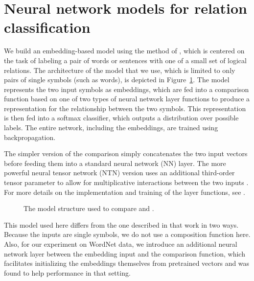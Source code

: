 
\section{Neural network models for relation classification} \label{methods}

We build an embedding-based model using the method of
\cite{Bowman:Potts:Manning:2014}, which is centered on the task of
labeling a pair of words or sentences with one of a small set of
logical relations. The architecture of the model that we use, which is
limited to only pairs of single symbols (such as words), is depicted
in Figure~\ref{sample-figure}. The model represents the two input
symbols as embeddings, which are fed into a comparison function based
on one of two types of neural network layer functions to produce a
representation for the relationship between the two symbols. This
representation is then fed into a softmax classifier, which outputs a
distribution over possible labels. The entire network, including the
embeddings, are trained using backpropagation. 

The simpler version of the comparison simply concatenates the two
input vectors before feeding them into a standard neural network (NN)
layer.  The more powerful neural tensor network (NTN) version uses an
additional third-order tensor parameter to allow for multiplicative
interactions between the two inputs \cite{chen2013learning}. For more
details on the implementation and training of the layer functions, see
\cite{Bowman:Potts:Manning:2014}.

\begin{figure}[tp]
  \centering
  
  \caption{The model structure used to compare  and .} 
  \label{sample-figure}
\end{figure}

This model used here differs from the one described in that work in
two ways. Because the inputs are single symbols, we do not use
a composition function here. Also, for our experiment on WordNet data, 
we introduce an additional neural network layer between the embedding 
input and the comparison function, which facilitates initializing the 
embeddings themselves from pretrained vectors and was found to help 
performance in that setting.


